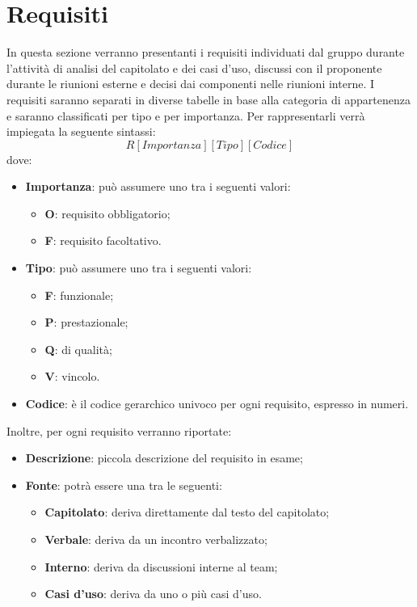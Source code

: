 \documentclass[../AnalisiDeiRequisiti.tex]{subfiles}
\begin{document}
\section{Requisiti}
In questa sezione verranno presentanti i requisiti individuati dal gruppo durante l'attività di analisi del capitolato e dei casi d'uso, discussi con il proponente durante le riunioni esterne e decisi dai componenti nelle riunioni interne. I requisiti saranno separati in diverse tabelle in base alla categoria di appartenenza e saranno classificati per tipo e per importanza. Per rappresentarli verrà impiegata la seguente sintassi:
\begin{equation*}
	R[Importanza][Tipo][Codice]
\end{equation*}
dove:
\begin{itemize}
	\item \textbf{Importanza}: può assumere uno tra i seguenti valori:
	\begin{itemize}
		\item \textbf{O}: requisito obbligatorio;
		\item \textbf{F}: requisito facoltativo.
	\end{itemize}
	\item \textbf{Tipo}: può assumere uno tra i seguenti valori:
	\begin{itemize}
		\item \textbf{F}: funzionale;
		\item \textbf{P}: prestazionale;
		\item \textbf{Q}: di qualità;
		\item \textbf{V}: vincolo.
	\end{itemize}	
	\item \textbf{Codice}: è il codice gerarchico univoco per ogni requisito, espresso in numeri.
\end{itemize}
Inoltre, per ogni requisito verranno riportate:
\begin{itemize}
	\item \textbf{Descrizione}: piccola descrizione del requisito in esame;
	\item \textbf{Fonte}: potrà essere una tra le seguenti:
	\begin{itemize}
		\item \textbf{Capitolato}: deriva direttamente dal testo del capitolato; 
		\item \textbf{Verbale}: deriva da un incontro verbalizzato;
		\item \textbf{Interno}: deriva da discussioni interne al team;
		\item \textbf{Casi d'uso}: deriva da uno o più casi d'uso.
	\end{itemize}
\end{itemize}
	
\end{document}
